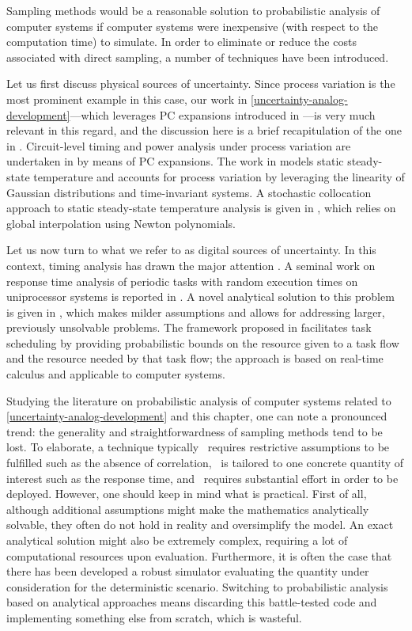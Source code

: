 Sampling methods would be a reasonable solution to probabilistic analysis of
computer systems if computer systems were inexpensive (with respect to the
computation time) to simulate. In order to eliminate or reduce the costs
associated with direct sampling, a number of techniques have been introduced.

Let us first discuss physical sources of uncertainty. Since process variation is
the most prominent example in this case, our work in
\cref{uncertainty-analog-development}---which leverages \ac{PC} expansions
\cite{xiu2010} introduced in ---is very much relevant in
this regard, and the discussion here is a brief recapitulation of the one in
. Circuit-level timing and power analysis under process
variation are undertaken in \cite{bhardwaj2008} by means of \ac{PC} expansions.
The work in \cite{juan2012} models static steady-state temperature and accounts
for process variation by leveraging the linearity of Gaussian distributions and
time-invariant systems. A stochastic collocation \cite{xiu2010} approach to
static steady-state temperature analysis is given in \cite{lee2013}, which
relies on global interpolation using Newton polynomials.

Let us now turn to what we refer to as digital sources of uncertainty. In this
context, timing analysis has drawn the major attention \cite{quinton2012}. A
seminal work on response time analysis of periodic tasks with random execution
times on uniprocessor systems is reported in \cite{diaz2002}. A novel analytical
solution to this problem is given in \cite{tanasa2015}, which makes milder
assumptions and allows for addressing larger, previously unsolvable problems.
The framework proposed in \cite{santinelli2011} facilitates task scheduling by
providing probabilistic bounds on the resource given to a task flow and the
resource needed by that task flow; the approach is based on real-time calculus
and applicable to computer systems.

Studying the literature on probabilistic analysis of computer systems related to
\cref{uncertainty-analog-development} and this chapter, one can note a
pronounced trend: the generality and straightforwardness of sampling methods
tend to be lost. To elaborate, a technique typically \one~requires restrictive
assumptions to be fulfilled such as the absence of correlation, \two~is tailored
to one concrete quantity of interest such as the response time, and
\three~requires substantial effort in order to be deployed. However, one should
keep in mind what is practical. First of all, although additional assumptions
might make the mathematics analytically solvable, they often do not hold in
reality and oversimplify the model. An exact analytical solution might also be
extremely complex, requiring a lot of computational resources upon evaluation.
Furthermore, it is often the case that there has been developed a robust
simulator evaluating the quantity under consideration for the deterministic
scenario. Switching to probabilistic analysis based on analytical approaches
means discarding this battle-tested code and implementing something else from
scratch, which is wasteful.


